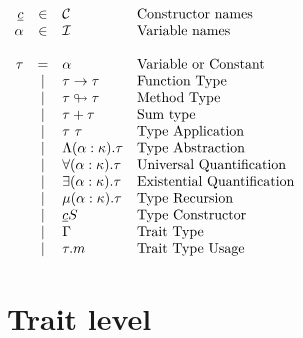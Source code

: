 \documentclass{article}[11pt]
\begin{document}
    \begin{math}
        \begin{array}{rclp{5cm}}
            \underline{c} & \in  & {\cal C}                     & Constructor names          \\
            \alpha        & \in  & {\cal I}                     & Variable names             \\
            \\
            \tau & =
            & \alpha                       & Variable or Constant              \\
            & \mid & \tau \rightarrow \tau        & Function Type              \\
            & \mid & \tau \looparrowright \tau    & Method Type              \\
            & \mid & \tau + \tau                  & Sum type              \\
            & \mid & \tau~\tau                    & Type Application              \\
            & \mid & \Lambda (\alpha:\kappa).\tau & Type Abstraction              \\
            & \mid & \forall (\alpha:\kappa).\tau & Universal Quantification              \\
            & \mid & \exists (\alpha:\kappa).\tau & Existential Quantification              \\
            & \mid & \mu(\alpha:\kappa).\tau      & Type Recursion              \\
            & \mid & \underline{c} S              & Type Constructor              \\
            & \mid & \Gamma                       & Trait Type              \\
            & \mid & \tau . m                     & Trait Type Usage              \\
        \end{array}
    \end{math}


    \section{Trait level}\label{sec:trait-level}
\end{document}
